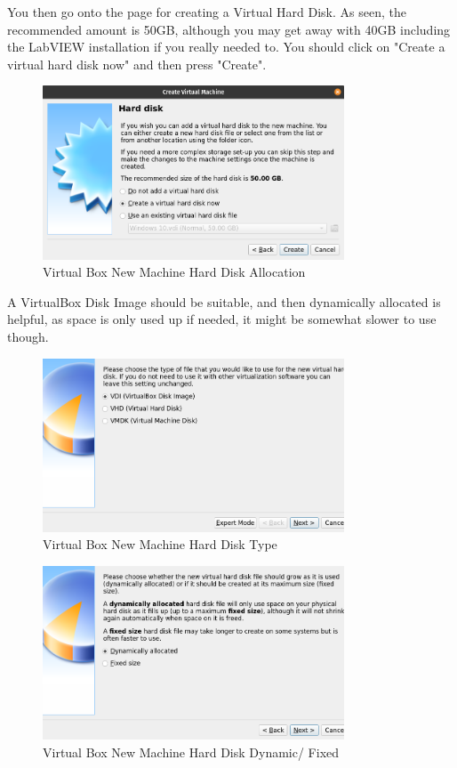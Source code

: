 \documentclass[a4paper,11pt]{report}
\begin{document}
You then go onto the page for creating a Virtual Hard Disk. As seen, the recommended amount is 50GB, although you may get away with 40GB including the LabVIEW installation if you really needed to. You should click on "Create a virtual hard disk now" and then press "Create".

\begin{figure}[H]
\centering
\includegraphics[width=0.8\textwidth]{screenshots/virtualboxharddisk}
\caption{Virtual Box New Machine Hard Disk Allocation}
\end{figure}

A VirtualBox Disk Image should be suitable, and then dynamically allocated is helpful, as space is only used up if needed, it might be somewhat slower to use though.

\begin{figure}[H]
\centering
\includegraphics[width=0.8\textwidth]{screenshots/virtualboxharddiskvdi}
\caption{Virtual Box New Machine Hard Disk Type}
\end{figure}

\begin{figure}[H]
\centering
\includegraphics[width=0.8\textwidth]{screenshots/virtualboxharddiskdynamic}
\caption{Virtual Box New Machine Hard Disk Dynamic/ Fixed}
\end{figure}
\end{document}
